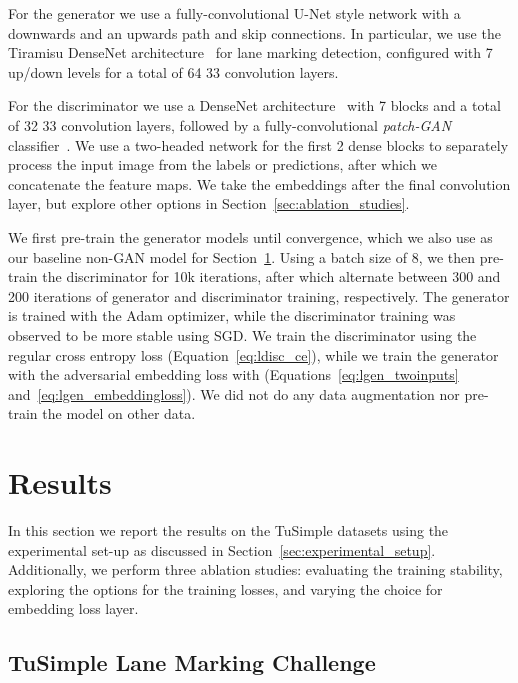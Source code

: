 \documentclass{article} \usepackage{nips13submit_e,times}
\begin{document}
For the generator we use a fully-convolutional U-Net style network with a downwards and an upwards path and skip connections.
In particular, we use the Tiramisu DenseNet architecture~\cite{jegou2017the} for lane marking detection, configured with 7 up/down levels for a total of 64 33 convolution layers.


For the discriminator we use a DenseNet architecture~\cite{huang2016densely} with 7 blocks and a total of 32 33 convolution layers, followed by a fully-convolutional \textit{patch-GAN} classifier~\cite{li2016precomputed}.
We use a two-headed network for the first 2 dense blocks to separately process the input image from the labels or predictions, after which we concatenate the feature maps.
We take the embeddings after the final convolution layer, but explore other options in Section~\ref{sec:ablation_studies}.

We first pre-train the generator models until convergence, which we also use as our baseline non-GAN model for Section~\ref{sec:results}.
Using a batch size of 8, we then pre-train the discriminator for 10k iterations, after which alternate between 300 and 200 iterations of generator and discriminator training, respectively.
The generator is trained with the Adam optimizer, while the discriminator training was observed to be more stable using SGD.
We train the discriminator using the regular cross entropy loss (Equation~\ref{eq:ldisc_ce}), while we train the generator with the adversarial embedding loss with  (Equations~\ref{eq:lgen_twoinputs} and~\ref{eq:lgen_embeddingloss}).
We did not do any data augmentation nor pre-train the model on other data.



\section{Results}
\label{sec:results}

In this section we report the results on the TuSimple datasets using the experimental set-up as discussed in Section~\ref{sec:experimental_setup}.
Additionally, we perform three ablation studies: evaluating the training stability, exploring the options for the training losses, and varying the choice for embedding loss layer.



\subsection{TuSimple Lane Marking Challenge}
\end{document}

